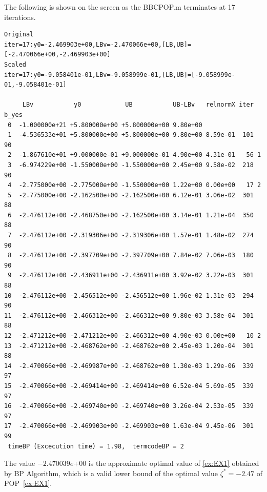 \documentclass[12pt]{article}
\def\matBP{BBCPOP}
\begin{document}
The following is shown on the screen  as the \matBP.m terminates at 17 iterations.



\begin{verbatim}
Original
iter=17:y0=-2.469903e+00,LBv=-2.470066e+00,[LB,UB]=[-2.470066e+00,-2.469903e+00]
Scaled
iter=17:y0=-9.058401e-01,LBv=-9.058999e-01,[LB,UB]=[-9.058999e-01,-9.058401e-01]

     LBv           y0            UB           UB-LBv   relnormX iter b_yes
 0  -1.000000e+21 +5.800000e+00 +5.800000e+00 9.80e+00 
 1  -4.536533e+01 +5.800000e+00 +5.800000e+00 9.80e+00 8.59e-01  101 90
 2  -1.867610e+01 +9.000000e-01 +9.000000e-01 4.90e+00 4.31e-01   56 1
 3  -6.974229e+00 -1.550000e+00 -1.550000e+00 2.45e+00 9.58e-02  218 90
 4  -2.775000e+00 -2.775000e+00 -1.550000e+00 1.22e+00 0.00e+00   17 2
 5  -2.775000e+00 -2.162500e+00 -2.162500e+00 6.12e-01 3.06e-02  301 88
 6  -2.476112e+00 -2.468750e+00 -2.162500e+00 3.14e-01 1.21e-04  350 88
 7  -2.476112e+00 -2.319306e+00 -2.319306e+00 1.57e-01 1.48e-02  274 90
 8  -2.476112e+00 -2.397709e+00 -2.397709e+00 7.84e-02 7.06e-03  180 90
 9  -2.476112e+00 -2.436911e+00 -2.436911e+00 3.92e-02 3.22e-03  301 88
10  -2.476112e+00 -2.456512e+00 -2.456512e+00 1.96e-02 1.31e-03  294 90
11  -2.476112e+00 -2.466312e+00 -2.466312e+00 9.80e-03 3.58e-04  301 88
12  -2.471212e+00 -2.471212e+00 -2.466312e+00 4.90e-03 0.00e+00   10 2
13  -2.471212e+00 -2.468762e+00 -2.468762e+00 2.45e-03 1.20e-04  301 88
14  -2.470066e+00 -2.469987e+00 -2.468762e+00 1.30e-03 1.29e-06  339 97
15  -2.470066e+00 -2.469414e+00 -2.469414e+00 6.52e-04 5.69e-05  339 97
16  -2.470066e+00 -2.469740e+00 -2.469740e+00 3.26e-04 2.53e-05  339 97
17  -2.470066e+00 -2.469903e+00 -2.469903e+00 1.63e-04 9.45e-06  301 99
 timeBP (Excecution time) = 1.98,  termcodeBP = 2
\end{verbatim}
The value  $ -2.470039e$+$00$ is the approximate optimal value of \eqref{ex:EX1} obtained by BP Algorithm, which is a valid lower bound 
of the optimal value $\zeta^* = -2.47$ of POP~\eqref{ex:EX1}. 
\end{document}
